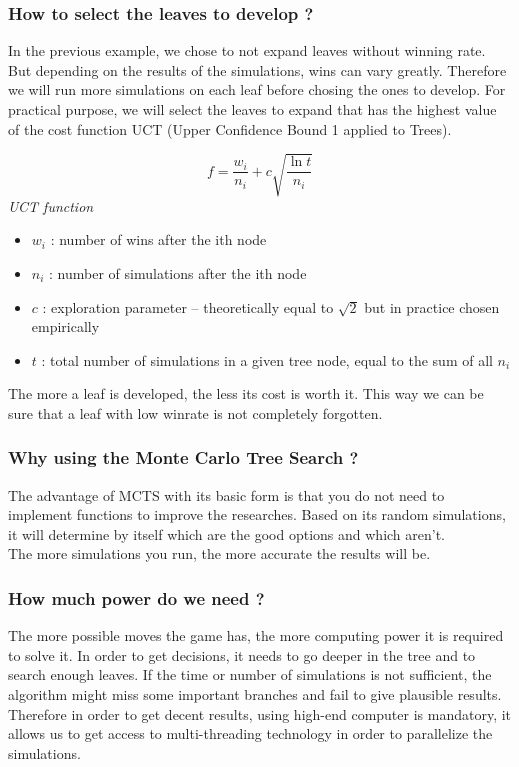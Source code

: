 \subsubsection{How to select the leaves to develop ?}
In the previous example, we chose to not expand leaves without winning rate. But depending on the results of the simulations, wins can vary greatly. Therefore we will run more simulations on each leaf before chosing the ones to develop. For practical purpose, we will select the leaves to expand that has the highest value of the cost function UCT (Upper Confidence Bound 1 applied to Trees).\\
\bigskip
\begin{minipage}[b]{1\linewidth}
\centering
\begin{equation*}
f = \frac{w_i}{n_i} + c\sqrt{\frac{\ln t}{n_i}}
\end{equation*}
\medskip
\textit{UCT function}\cite{formula_UCT}

\end{minipage}%
\bigskip
\begin{itemize}
  \item \ensuremath{w_i} : number of wins after the ith node
  \item \ensuremath{n_i} : number of simulations after the ith node
  \item \ensuremath{c}   : exploration parameter – theoretically equal to \ensuremath{\sqrt{2}} but in practice chosen empirically
  \item \ensuremath{t}   : total number of simulations in a given tree node, equal to the sum of all \ensuremath{n_i}
\end{itemize}
The more a leaf is developed, the less its cost is worth it. This way we can be sure that a leaf with low winrate is not completely forgotten.\\

\subsubsection{Why using the Monte Carlo Tree Search ?}
 The advantage of MCTS with its basic form is that you do not need to implement functions to improve the researches. Based on its random simulations, it will determine by itself which are the good options and which aren't.\\ The more simulations you run, the more accurate the results will be.

\subsubsection{How much power do we need ?}
The more possible moves the game has, the more computing power it is required to solve it. In order to get decisions, it needs to go deeper in the tree and to search enough leaves. If the time or number of simulations is not sufficient, the algorithm might miss some important branches and fail to give plausible results. Therefore in order to get decent results, using high-end computer is mandatory, it allows us to get access to multi-threading technology in order to parallelize the simulations.